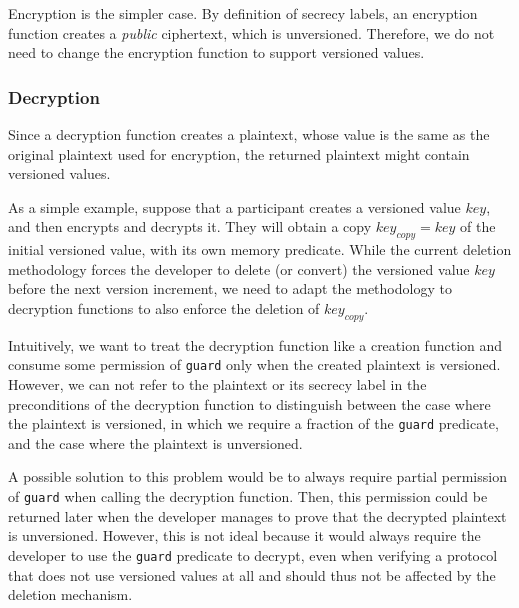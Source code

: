 Encryption is the simpler case. By definition of secrecy labels, an encryption function creates a \emph{public} ciphertext, which is unversioned.
Therefore, we do not need to change the encryption function to support versioned values.

\subsubsection{Decryption}

Since a decryption function creates a plaintext, whose value is the same as the original plaintext used for encryption, the returned plaintext might contain versioned values.

As a simple example, suppose that a participant creates a versioned value $key$, and then encrypts and decrypts it.
They will obtain a copy $key_{copy}=key$ of the initial versioned value, with its own memory predicate.
While the current deletion methodology forces the developer to delete (or convert) the versioned value $key$ before the next version increment, we need to adapt the methodology to decryption functions to also enforce the deletion of $key_{copy}$.

Intuitively, we want to treat the decryption function like a creation function and consume some permission of \texttt{guard} only when the created plaintext is versioned.
However, we can not refer to the plaintext or its secrecy label in the preconditions of the decryption function to distinguish between the case where the plaintext is versioned, in which we require a fraction of the \texttt{guard} predicate, and the case where the plaintext is unversioned.

A possible solution to this problem would be to always require partial permission of \texttt{guard} when calling the decryption function.
Then, this permission could be returned later when the developer manages to prove that the decrypted plaintext is unversioned.
However, this is not ideal because it would always require the developer to use the \texttt{guard} predicate to decrypt, even when verifying a protocol that does not use versioned values at all and should thus not be affected by the deletion mechanism.

